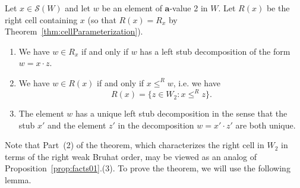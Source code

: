 \documentclass[ALCO,Unicode,published]{cedram}
\newcommand{\la}{\mathbf{a}}
\newcommand{\sw}{\mathcal{S}(W)}
\begin{document}
\begin{thm}
    \label{thm:CellViaDecomp}
    Let $x\in \sw$ and let $w$ be an element of $\la$-value 2 in $W$. Let $R(x)$ be the right cell containing $x$
    \textup{(}so that $R(x)=R_x$ by Theorem~\ref{thm:cellParameterization}\textup{)}.
    \begin{enumerate}
        \item We have  $w\in R_x$ if and only if $w$ has a left stub decomposition of the form $w=x\cdot z$.
        \item We have $w\in R(x)$ if and only if $x\le^R w$, i.e. we have 
        \[
            R(x)=\{z\in W_2: x\le^R z\}.
        \]
        \item The element $w$ has a unique left stub decomposition in the sense that the stub $x'$ and the
             element  $z'$ in the decomposition $w=x'\cdot z'$ are both unique.
    \end{enumerate}
\end{thm}

\noindent
Note that Part~(2) of the theorem, which characterizes the right cell in $W_2$ in terms of the right
weak Bruhat order, may be viewed as an analog of Proposition~\ref{prop:facts01}.(3). To prove the theorem, we
will use the following lemma. 
\end{document}
